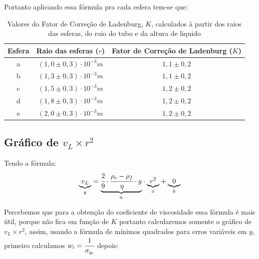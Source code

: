 \documentclass[english,brazil]{article}
\providecommand{\tabularnewline}{\\}
\begin{document}
			Portanto aplicando essa fórmula pra cada esfera tem-se que:

			\begin{table}[H]
				\caption{Valores do Fator de Correção de Ladenburg, $K$, calculados à partir dos raios das esferas, do raio do tubo e da altura de liquido}
				\centering{}%
				\begin{tabular}{|c|c|c|}
					\hline 
					Esfera  & Raio das esferas ($r$)  & Fator de Correção de Ladenburg ($K$)\tabularnewline
					\hline 
					a  & $(1,0\pm0,3)\cdot10^{-3}\unit{m}$  & $1,1\pm0,2$\tabularnewline
					\hline 
					b  & $(1,3\pm0,3)\cdot10^{-3}\unit{m}$  & $1,1\pm0,2$\tabularnewline
					\hline 
					c  & $(1,5\pm0,3)\cdot10^{-3}\unit{m}$  & $1,2\pm0,2$\tabularnewline
					\hline 
					d  & $(1,8\pm0,3)\cdot10^{-3}\unit{m}$  & $1,2\pm0,2$\tabularnewline
					\hline 
					e  & $(2,0\pm0,3)\cdot10^{-3}\unit{m}$  & $1,2\pm0,2$\tabularnewline
					\hline 
				\end{tabular}
			\end{table}

		\subsection{Gráfico de $v_{L}\times r^{2}$}

			Tendo a fórmula:
			\begin{equation}
				\underset{y}{\underbrace{v{}_{L}}}=\underset{a}{\underbrace{\cfrac{2}{9}\cdot\cfrac{\rho_{e}-\rho_{f}}{\eta}\cdot g}}\cdot\underset{x}{\underbrace{r^{2}}}+\underset{b}{\underbrace{0}}
			\end{equation}

			Percebemos que para a obtenção do coeficiente de viscosidade essa fórmula é mais útil, porque não fica em função de $K$ portanto calcularemos somente o gráfico de $v_{L}\times r^{2}$, assim, usando a fórmula de mínimos quadrados para erros variáveis em $y$, primeiro calculamos $w_{i}=\cfrac{1}{\sigma_{y_{i}}}$ depois:
\end{document}
